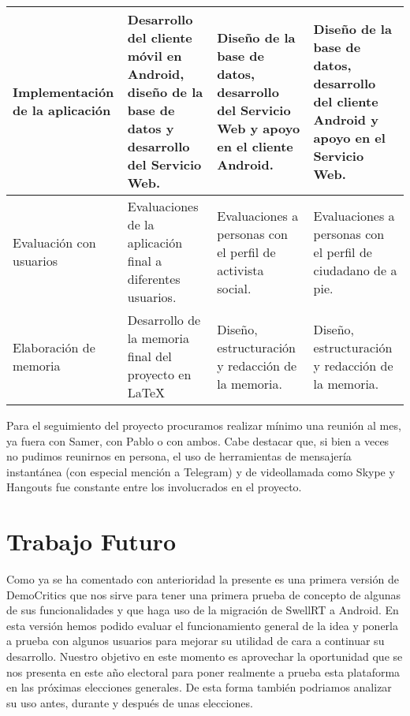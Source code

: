 \begin{table}[!]
\begin{sideways}
\begin{tabular}{|m{3cm}|m{5.5cm}|m{5cm}|m{5cm}|}
Implementación de la aplicación   & Desarrollo del cliente móvil en Android, diseño de la base de datos y desarrollo del Servicio Web.                                       & Diseño de la base de datos, desarrollo del Servicio Web y apoyo en el cliente Android.                                             & Diseño de la base de datos, desarrollo del cliente Android y apoyo en el Servicio Web.                       \\ \hline
Evaluación con usuarios           & Evaluaciones de la aplicación final a diferentes usuarios.                                                                               & Evaluaciones a personas con el perfil de activista social.                                                                         & Evaluaciones a personas con el perfil de ciudadano de a pie.                                                 \\ \hline
Elaboración de memoria            & Desarrollo de la memoria final del proyecto en \LaTeX\.                                                                                & Diseño, estructuración y redacción de la memoria.                                                                                  & Diseño, estructuración y redacción de la memoria.                                                            \\ \hline
\end{tabular}
\end{sideways}
\end{table}

Para el seguimiento del proyecto procuramos realizar mínimo una reunión al mes, ya fuera con Samer, con Pablo o con ambos. Cabe destacar que, si bien a veces no pudimos reunirnos en persona, el uso de herramientas de mensajería instantánea (con especial mención a Telegram) y de videollamada como Skype y Hangouts fue constante entre los involucrados en el proyecto.

\section{Trabajo Futuro}

Como ya se ha comentado con anterioridad la presente es una primera versión de DemoCritics que nos sirve para tener una primera prueba de concepto de algunas de sus funcionalidades y que haga uso de la migración de SwellRT a Android. En esta versión hemos podido evaluar el funcionamiento general de la idea y ponerla a prueba con algunos usuarios para mejorar su utilidad de cara a continuar su desarrollo. Nuestro objetivo en este momento es aprovechar la oportunidad que se nos presenta en este año electoral para poner realmente a prueba esta plataforma en las próximas elecciones generales. De esta forma también podriamos analizar su uso antes, durante y después de unas elecciones.

